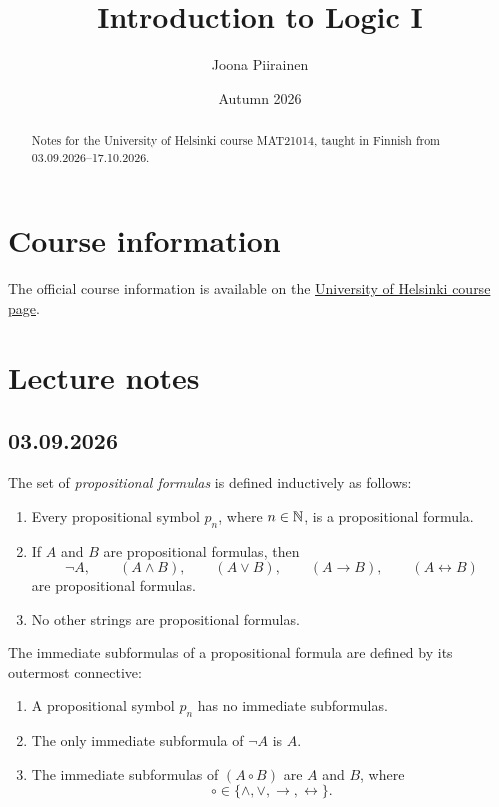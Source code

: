 \documentclass[12pt, a4paper]{article}
\title{Introduction to Logic I}
\author{Joona Piirainen}
\date{Autumn 2026}
\begin{document}
\maketitle

\begin{abstract}
  Notes for the University of Helsinki course MAT21014, taught in Finnish
  from 03.09.2026--17.10.2026.
\end{abstract}

\tableofcontents

\section{Course information}

The official course information is available on the
\href{https://studies.helsinki.fi/kurssit/opintojakso/otm-836bfa0a-198b-4cab-b040-6c0bd165b235/MAT21014}{University
of Helsinki course page}.

\section{Lecture notes}

\subsection{03.09.2026}

\begin{definition}
  The set of \emph{propositional formulas} is defined inductively as follows:
  \begin{enumerate}
    \item Every propositional symbol \(p_n\), where \(n \in \mathbb{N}\), is a
      propositional formula.
    \item If \(A\) and \(B\) are propositional formulas, then
      \[
        \neg A, \qquad
        (A \land B), \qquad
        (A \lor B), \qquad
        (A \rightarrow B), \qquad
        (A \leftrightarrow B)
      \]
      are propositional formulas.
    \item No other strings are propositional formulas.
  \end{enumerate}
\end{definition}

\begin{definition}
  The immediate subformulas of a propositional formula are defined by its
  outermost connective:
  \begin{enumerate}
    \item A propositional symbol \(p_n\) has no immediate subformulas.
    \item The only immediate subformula of \(\neg A\) is \(A\).
    \item The immediate subformulas of \((A \mathbin{\circ} B)\) are \(A\)
      and \(B\), where
      \[
        \circ \in \{\land, \lor, \rightarrow, \leftrightarrow\}.
      \]
  \end{enumerate}
\end{definition}
\end{document}
